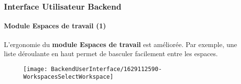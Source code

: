 %

\begin{frame}[fragile]
	\frametitle{Interface Utilisateur Backend}
	\framesubtitle{Module Espaces de travail (1)}

	L'ergonomie du \textbf{module Espaces de travail} est améliorée. Par exemple,
	une liste déroulante en haut permet de basculer facilement entre les espaces.

	\begin{figure}
		\texttt{[image: BackendUserInterface/1629112590-WorkspacesSelectWorkspace]}
	\end{figure}

\end{frame}

